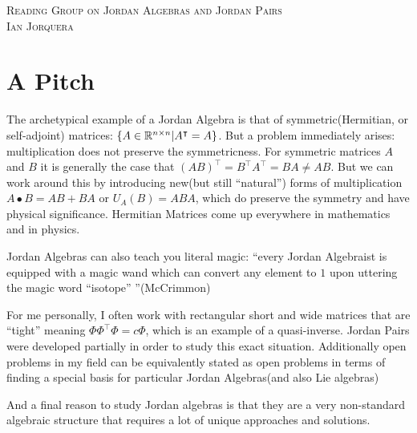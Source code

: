 \documentclass[12pt]{amsart}
\begin{document}
\begin{center}
    \textsc{Reading Group on Jordan Algebras and Jordan Pairs\\ Ian Jorquera}
\end{center}
\vspace{1em}

\section*{A Pitch}
The archetypical example of a Jordan Algebra is that of symmetric(Hermitian, or self-adjoint) matrices: 
$\{A\in \mathbb{R}^{n\times n}| A^\intercal=A\}$. But a problem immediately arises: multiplication does not 
preserve the symmetricness. For symmetric matrices $A$ and $B$ it is generally the case that
$(AB)^\intercal=B^\intercal A^\intercal = BA\neq AB$. But we can work around this by 
introducing new(but still ``natural'') forms of multiplication $A\bullet B= AB+BA$ or 
$U_A(B)=ABA$, which do preserve the symmetry and have physical significance. Hermitian Matrices 
come up everywhere in mathematics and in physics.

Jordan Algebras can also teach you literal magic: ``every Jordan Algebraist is equipped 
with a magic wand which can convert any element to $1$ upon uttering the magic word ``isotope'' ''(McCrimmon)

For me personally, I often work with rectangular short and wide matrices that are 
``tight'' meaning $\Phi\Phi^\intercal\Phi=c\Phi$, which is an example of a quasi-inverse.
Jordan Pairs were developed partially in order to study this exact situation.
Additionally open problems in my field can be equivalently stated as open problems in terms of
finding a special basis for particular Jordan Algebras(and also Lie algebras)

And a final reason to study Jordan algebras is that they are a very non-standard algebraic 
structure that requires a lot of unique approaches and solutions.
\end{document}
